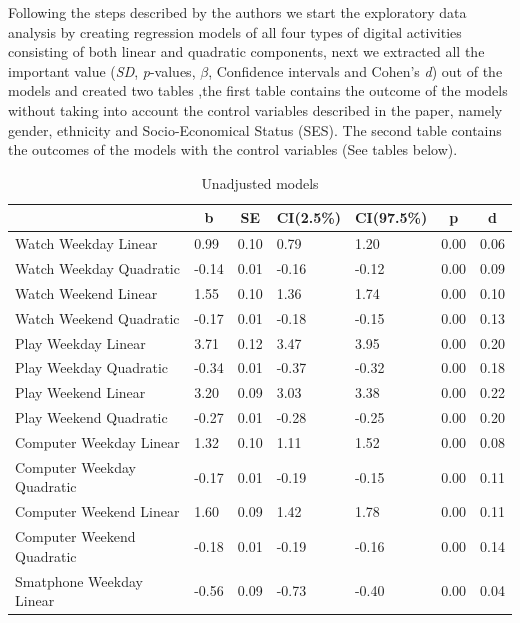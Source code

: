 \documentclass[man]{apa6}
\theoremstyle{definition}
\theoremstyle{definition}
\theoremstyle{definition}
\theoremstyle{remark}
\begin{document}
Following the steps described by the authors we start the exploratory
data analysis by creating regression models of all four types of digital
activities consisting of both linear and quadratic components, next we
extracted all the important value (\emph{SD}, \emph{p}-values,
\emph{\(\beta\)}, Confidence intervals and Cohen's \emph{d}) out of the
models and created two tables ,the first table contains the outcome of
the models without taking into account the control variables described
in the paper, namely gender, ethnicity and Socio-Economical Status
(SES). The second table contains the outcomes of the models with the
control variables (See tables below).

\begin{table}[tbp]
\begin{center}
\begin{threeparttable}
\caption{\label{tab:unnamed-chunk-1}Unadjusted models}
\begin{tabular}{lllllll}
\toprule
 & \multicolumn{1}{c}{b} & \multicolumn{1}{c}{SE} & \multicolumn{1}{c}{CI(2.5\%)} & \multicolumn{1}{c}{CI(97.5\%)} & \multicolumn{1}{c}{p} & \multicolumn{1}{c}{d}\\
\midrule
Watch Weekday Linear & 0.99 & 0.10 & 0.79 & 1.20 & 0.00 & 0.06\\
Watch Weekday Quadratic & -0.14 & 0.01 & -0.16 & -0.12 & 0.00 & 0.09\\
Watch Weekend Linear & 1.55 & 0.10 & 1.36 & 1.74 & 0.00 & 0.10\\
Watch Weekend Quadratic & -0.17 & 0.01 & -0.18 & -0.15 & 0.00 & 0.13\\
Play Weekday Linear & 3.71 & 0.12 & 3.47 & 3.95 & 0.00 & 0.20\\
Play Weekday Quadratic & -0.34 & 0.01 & -0.37 & -0.32 & 0.00 & 0.18\\
Play Weekend Linear & 3.20 & 0.09 & 3.03 & 3.38 & 0.00 & 0.22\\
Play Weekend Quadratic & -0.27 & 0.01 & -0.28 & -0.25 & 0.00 & 0.20\\
Computer Weekday Linear & 1.32 & 0.10 & 1.11 & 1.52 & 0.00 & 0.08\\
Computer Weekday Quadratic & -0.17 & 0.01 & -0.19 & -0.15 & 0.00 & 0.11\\
Computer Weekend Linear & 1.60 & 0.09 & 1.42 & 1.78 & 0.00 & 0.11\\
Computer Weekend Quadratic & -0.18 & 0.01 & -0.19 & -0.16 & 0.00 & 0.14\\
Smatphone Weekday Linear & -0.56 & 0.09 & -0.73 & -0.40 & 0.00 & 0.04\\

\end{tabular}
\end{threeparttable}
\end{center}
\end{table}
\end{document}
